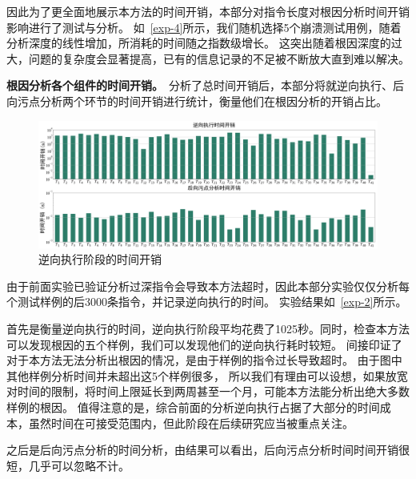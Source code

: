 因此为了更全面地展示本方法的时间开销，本部分对指令长度对根因分析时间开销影响进行了测试与分析。
如~\autoref{exp-4}所示，我们随机选择5个崩溃测试用例，随着分析深度的线性增加，所消耗的时间随之指数级增长。
这突出随着根因深度的过大，问题的复杂度会显著提高，已有的信息记录的不足被不断放大直到难以解决。

\textbf{根因分析各个组件的时间开销。}\ 分析了总时间开销后，本部分将就逆向执行、后向污点分析两个环节的时间开销进行统计，衡量他们在根因分析的开销占比。
\begin{figure}[h]
    \centering
    \includegraphics[width=1\textwidth]{./figure/sns_2_exp_resolve_time_backward_tainting_time.png}
    \caption{逆向执行阶段的时间开销}
    \label{exp-2}
\end{figure}
由于前面实验已验证分析过深指令会导致本方法超时，因此本部分实验仅仅分析每个测试样例的后3000条指令，并记录逆向执行的时间。
实验结果如~\autoref{exp-2}所示。

首先是衡量逆向执行的时间，逆向执行阶段平均花费了1025秒。同时，检查本方法可以发现根因的五个样例，我们可以发现他们的逆向执行耗时较短。
间接印证了对于本方法无法分析出根因的情况，是由于样例的指令过长导致超时。
由于图中其他样例分析时间并未超出这5个样例很多，
所以我们有理由可以设想，如果放宽对时间的限制，将时间上限延长到两周甚至一个月，可能本方法能分析出绝大多数样例的根因。
值得注意的是，综合前面的分析逆向执行占据了大部分的时间成本，虽然时间在可接受范围内，但此阶段在后续研究应当被重点关注。

之后是后向污点分析的时间分析，由结果可以看出，后向污点分析时间时间开销很短，几乎可以忽略不计。


